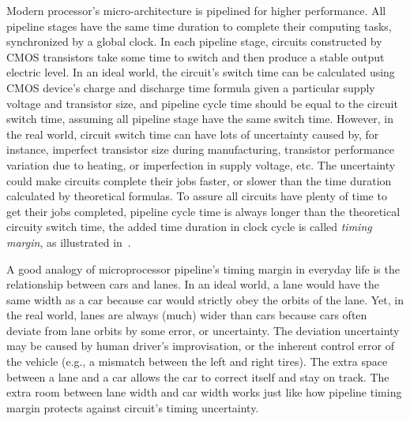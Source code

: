 Modern processor's micro-architecture is pipelined for higher performance. All pipeline stages have the same time duration to complete their computing tasks, synchronized by a global clock. In each pipeline stage, circuits constructed by CMOS transistors take some time to switch and then produce a stable output electric level. In an ideal world, the circuit's switch time can be calculated using CMOS device's charge and discharge time formula given a particular supply voltage and transistor size, and pipeline cycle time should be equal to the circuit switch time, assuming all pipeline stage have the same switch time. However, in the real world, circuit switch time can have lots of uncertainty caused by, for instance, imperfect transistor size during manufacturing, transistor performance variation due to heating, or imperfection in supply voltage, etc. The uncertainty could make circuits complete their jobs faster, or slower than the time duration calculated by theoretical formulas. To assure all circuits have plenty of time to get their jobs completed, pipeline cycle time is always longer than the theoretical circuity switch time, the added time duration in clock cycle is called \textit{timing margin}, as illustrated in~.

A good analogy of microprocessor pipeline's timing margin in everyday life is the relationship between cars and lanes. In an ideal world, a lane would have the same width as a car because car would strictly obey the orbits of the lane. Yet, in the real world, lanes are always (much) wider than cars because cars often deviate from lane orbits by some error, or uncertainty. The deviation uncertainty may be caused by human driver's improvisation, or the inherent control error of the vehicle (e.g., a mismatch between the left and right tires). The extra space between a lane and a car allows the car to correct itself and stay on track. The extra room between lane width and car width works just like how pipeline timing margin protects against circuit's timing uncertainty.

